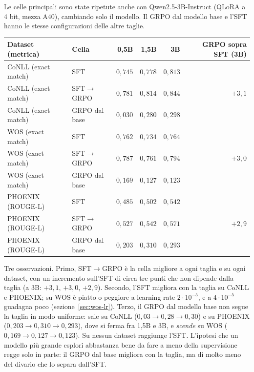 Le celle principali sono state ripetute anche con Qwen2.5-3B-Instruct (QLoRA a
4 bit, mezza A40), cambiando solo il modello. Il GRPO dal modello base e l'SFT
hanno le stesse configurazioni delle altre taglie.

\begin{center}
\small
\begin{tabular}{llrrrr}
\toprule
Dataset (metrica) & Cella & 0,5B & 1,5B & 3B & GRPO sopra SFT (3B) \\
\midrule
CoNLL (exact match) & SFT           & $0{,}745$ & $0{,}778$ & $0{,}813$ & \\
CoNLL (exact match) & SFT$\to$GRPO  & $0{,}781$ & $0{,}814$ & $0{,}844$ & $+3{,}1$ \\
CoNLL (exact match) & GRPO dal base & $0{,}030$ & $0{,}280$ & $0{,}298$ & \\
WOS (exact match)   & SFT           & $0{,}762$ & $0{,}734$ & $0{,}764$ & \\
WOS (exact match)   & SFT$\to$GRPO  & $0{,}787$ & $0{,}761$ & $0{,}794$ & $+3{,}0$ \\
WOS (exact match)   & GRPO dal base & $0{,}169$ & $0{,}127$ & $0{,}123$ & \\
PHOENIX (ROUGE-L)   & SFT           & $0{,}485$ & $0{,}502$ & $0{,}542$ & \\
PHOENIX (ROUGE-L)   & SFT$\to$GRPO  & $0{,}527$ & $0{,}542$ & $0{,}571$ & $+2{,}9$ \\
PHOENIX (ROUGE-L)   & GRPO dal base & $0{,}203$ & $0{,}310$ & $0{,}293$ & \\
\bottomrule
\end{tabular}
\end{center}

Tre osservazioni. Primo, SFT$\to$GRPO è la cella migliore a ogni taglia e su ogni
dataset, con un incremento sull'SFT di circa tre punti che non dipende dalla
taglia (a 3B: $+3{,}1$, $+3{,}0$, $+2{,}9$). Secondo, l'SFT migliora con la
taglia su CoNLL e PHOENIX; su WOS è piatto o peggiore a learning rate $2\cdot
10^{-5}$, e a $4\cdot 10^{-5}$ guadagna poco (sezione~\ref{sec:wos-lr}). Terzo, il GRPO dal modello base non segue la taglia in
modo uniforme: sale su CoNLL ($0{,}03 \to 0{,}28 \to 0{,}30$) e su PHOENIX
($0{,}203 \to 0{,}310 \to 0{,}293$), dove si ferma fra 1,5B e 3B, e
\emph{scende} su WOS ($0{,}169 \to 0{,}127 \to 0{,}123$). Su nessun dataset
raggiunge l'SFT. L'ipotesi che un modello più grande esplori abbastanza bene da
fare a meno della supervisione regge solo in parte: il GRPO dal base migliora
con la taglia, ma di molto meno del divario che lo separa dall'SFT.

